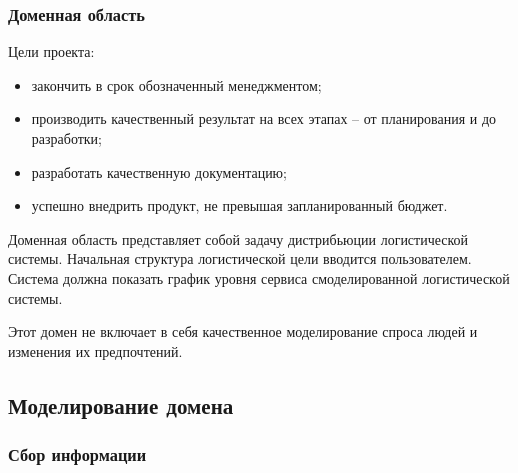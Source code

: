 \subsubsection{Доменная область}
Цели проекта:
\begin{itemize}
    \item закончить в срок обозначенный менеджментом;
    \item производить качественный результат на всех этапах -- от планирования и до разработки;
    \item разработать качественную документацию;
    \item успешно внедрить продукт, не превышая запланированный бюджет.
\end{itemize}

Доменная область представляет собой задачу дистрибьюции логистической системы. 
Начальная структура логистической цели вводится пользователем. 
Система должна показать график уровня сервиса смоделированной логистической системы.

Этот домен не включает в себя качественное моделирование спроса людей и изменения их предпочтений.

\subsection{Моделирование домена}
\subsubsection{Сбор информации}

